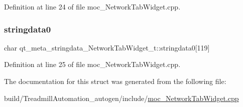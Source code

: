 Definition at line 24 of file moc\+\_\+\+Network\+Tab\+Widget.\+cpp.

\mbox{\label{structqt__meta__stringdata___network_tab_widget__t_ad52a0d68cf09ba5542b2a875b0b138eb}} 
\subsubsection{\texorpdfstring{stringdata0}{stringdata0}}
{\footnotesize\ttfamily char qt\+\_\+meta\+\_\+stringdata\+\_\+\+Network\+Tab\+Widget\+\_\+t\+::stringdata0\mbox{[}119\mbox{]}}



Definition at line 25 of file moc\+\_\+\+Network\+Tab\+Widget.\+cpp.



The documentation for this struct was generated from the following file\+:\begin{DoxyCompactItemize}
\item 
build/\+Treadmill\+Automation\+\_\+autogen/include/\hyperlink{moc___network_tab_widget_8cpp}{moc\+\_\+\+Network\+Tab\+Widget.\+cpp}\end{DoxyCompactItemize}
